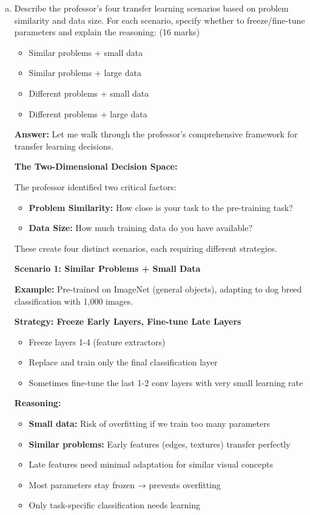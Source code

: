 \documentclass[12pt]{article}
\newcommand{\answer}[1]{{\color{answercolor}\textbf{Answer:} #1}}
\newcommand{\explanation}[1]{{\color{explanationcolor}#1}}
\begin{document}
\begin{enumerate}[(a)]
    \item Describe the professor's four transfer learning scenarios based on problem similarity and data size. For each scenario, specify whether to freeze/fine-tune parameters and explain the reasoning: \hfill (16 marks)
    \begin{itemize}
        \item Similar problems + small data
        \item Similar problems + large data  
        \item Different problems + small data
        \item Different problems + large data
    \end{itemize}
    
    \answer{
    Let me walk through the professor's comprehensive framework for transfer learning decisions.
    
    \textbf{The Two-Dimensional Decision Space:}
    
    \explanation{
    The professor identified two critical factors:
    \begin{itemize}
        \item \textbf{Problem Similarity:} How close is your task to the pre-training task?
        \item \textbf{Data Size:} How much training data do you have available?
    \end{itemize}
    
    These create four distinct scenarios, each requiring different strategies.
    }
    
    \textbf{Scenario 1: Similar Problems + Small Data}
    
    \explanation{
    \textbf{Example:} Pre-trained on ImageNet (general objects), adapting to dog breed classification with 1,000 images.
    
    \textbf{Strategy: Freeze Early Layers, Fine-tune Late Layers}
    \begin{itemize}
        \item Freeze layers 1-4 (feature extractors)
        \item Replace and train only the final classification layer
        \item Sometimes fine-tune the last 1-2 conv layers with very small learning rate
    \end{itemize}
    
    \textbf{Reasoning:}
    \begin{itemize}
        \item \textbf{Small data:} Risk of overfitting if we train too many parameters
        \item \textbf{Similar problems:} Early features (edges, textures) transfer perfectly
        \item Late features need minimal adaptation for similar visual concepts
        \item Most parameters stay frozen → prevents overfitting
        \item Only task-specific classification needs learning
    \end{itemize}
    
}}
\end{enumerate}
\end{document}
